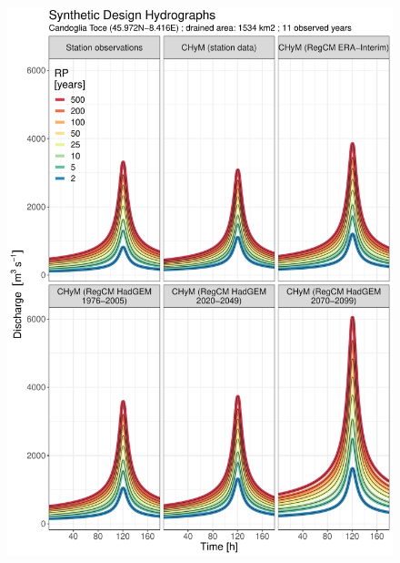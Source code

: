 \begin{figure}
    \centering
        \includegraphics[width=0.45\textheight]{figures/valid_Q/SDH/id4_SDH_reg1_22}

\end{figure}
